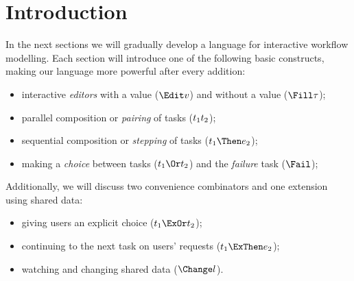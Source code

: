 
\section{Introduction}

In the next sections we will gradually develop a language for interactive workflow modelling.
Each section will introduce one of the following basic constructs,
making our language more powerful after every addition:
\begin{itemize}
  \item interactive \emph{editors} with a value ($\Edit v$) and without a value ($\Fill \tau$);
  \item parallel composition or \emph{pairing} of tasks ($t_1 \relax t_2$);
  \item sequential composition or \emph{stepping} of tasks ($t_1 \Then e_2$);
  \item making a \emph{choice} between tasks ($t_1 \Or t_2$) and the \emph{failure} task ($\Fail$);
\end{itemize}
Additionally, we will discuss two convenience combinators and one extension using shared data:
\begin{itemize}
  \item giving users an explicit choice ($t_1 \ExOr t_2$);
  \item continuing to the next task on users' requests ($t_1 \ExThen e_2$);
  \item watching and changing shared data ($\Change l$).
\end{itemize}

